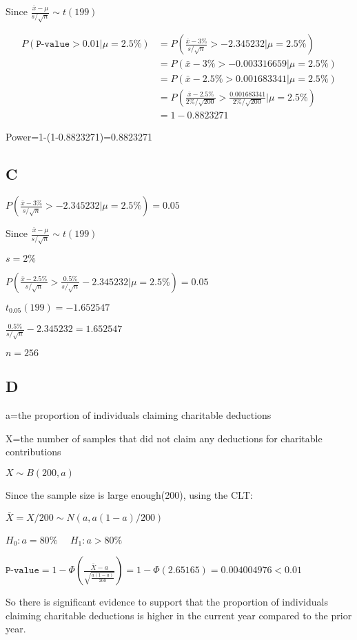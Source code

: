 \documentclass{article}
\begin{document}
Since $\frac{\bar{x}-\mu}{s/\sqrt{n}}\sim t(199)$

\begin{equation*}
	\begin{split}
		P(\texttt{P-value}>0.01|\mu=2.5\%)&=P(\frac{\bar{x}-3\%}{s/\sqrt{n}}>-2.345232|\mu=2.5\%)\\
		&=P(\bar{x}-3\%>-0.003316659|\mu=2.5\%)\\
		&=P(\bar{x}-2.5\%>0.001683341|\mu=2.5\%)\\
		&=P(\frac{\bar{x}-2.5\%}{2\%/\sqrt{200}}>\frac{0.001683341}{2\%/\sqrt{200}}|\mu=2.5\%)\\
		&=1-0.8823271
	\end{split}
\end{equation*}

Power=1-(1-0.8823271)=0.8823271

\newpage

\subsection*{C}
$P(\frac{\bar{x}-3\%}{s/\sqrt{n}}>-2.345232|\mu=2.5\%)=0.05$

Since $\frac{\bar{x}-\mu}{s/\sqrt{n}}\sim t(199)$

$s=2\%$

$P(\frac{\bar{x}-2.5\%}{s/\sqrt{n}}>\frac{0.5\%}{s/\sqrt{n}}-2.345232|\mu=2.5\%)=0.05$

$t_{0.05}(199)=-1.652547$

$\frac{0.5\%}{s/\sqrt{n}}-2.345232=1.652547$

$n=256$

\subsection*{D}

a=the proportion of individuals claiming charitable deductions

X=the number of samples that did not
claim any deductions for charitable contributions

$X\sim B(200,a)$

Since the sample size is large enough(200), using the CLT:

$\bar{X}=X/200\sim N(a,a(1-a)/200)$

$H_0:a=80\%$ $\quad H_1: a>80\%$

$\texttt{P-value}=1-\Phi(\frac{\bar{X}-a}{\sqrt{\frac{a(1-a)}{200}}})=1-\Phi(2.65165)=0.004004976<0.01$

So there is significant evidence to support that the proportion of individuals claiming charitable deductions is
higher in the current year compared to the prior year.
\end{document}

